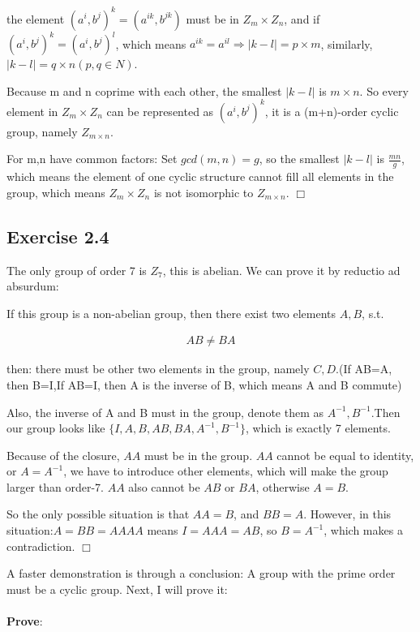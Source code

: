 \documentclass[]{ctexart}
\begin{document}
    the element $(a^i,b^j)^k=(a^{ik},b^{jk})$ must be in  $Z_m \times Z_n$, and if $(a^i,b^j)^k=(a^i,b^j)^l$, which means $a^{ik}=a^{il} \Rightarrow |k-l|=p\times m$, similarly, $|k-l|=q \times n(p,q\in N)$. 
    
    Because m and n coprime with each other, the smallest $ |k-l| $ is $m\times n$.
    So every element in $Z_m \times Z_n$ can be represented as $(a^i,b^j)^k$, it is a (m+n)-order cyclic group, namely $Z_{m\times n}$. 
    
    For m,n have common factors: Set $gcd(m,n)=g$, so the smallest $ |k-l| $ is $\frac{mn}{g}$, which means the element of one cyclic structure cannot fill all elements in the group, which means $Z_m \times Z_n$ is not isomorphic to $Z_{m\times n}$. $\Box$
    
    \subsection{Exercise 2.4}
    The only group of order 7 is $Z_7$, this is abelian. We can prove it by reductio ad absurdum:
    
    If this group is a non-abelian group, then there exist two elements $A,B$, s.t. 
    
    \begin{equation*}
    	\begin{aligned}
    	AB\ne BA
    	\end{aligned}
    \end{equation*}
    
    then: there must be other two elements in the group, namely $C,D$.(If AB=A, then B=I,If AB=I, then A is the inverse of B, which means A and B commute)
    
    Also, the inverse of A and B must in the group, denote them as $A^{-1},B^{-1}$.Then our group looks like $\{I,A,B,AB,BA,A^{-1},B^{-1}\}$, which is exactly 7 elements. 
    
    Because of the closure, $AA$ must be in the group. $AA$ cannot be equal to identity, or $A=A^{-1}$, we have to introduce other elements, which will make the group larger than order-7. $AA$ also cannot be $AB$ or $BA$, otherwise $A=B$. 
    
    So the only possible situation is that $AA=B$, and $BB=A$. However, in this situation:$A=BB=AAAA$ means $I=AAA=AB$, so $B=A^{-1}$, which makes a contradiction. $\Box$
    
    A faster demonstration is through a conclusion: A group with the prime order must be a cyclic group. Next, I will prove it:\\
    \\
    \textbf{Prove}: 
    
\end{document}
